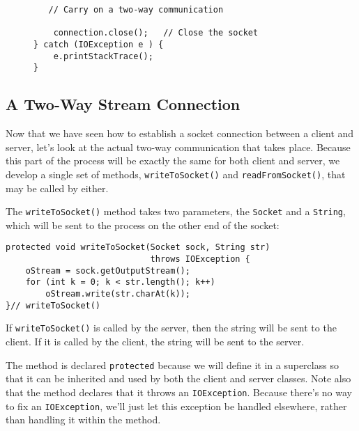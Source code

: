 {\begin{figure}[thb]
\begin{jjjlisting}
\begin{lstlisting}
   // Carry on a two-way communication

    connection.close();   // Close the socket
} catch (IOException e ) {
    e.printStackTrace();
}
\end{lstlisting}
\end{jjjlisting}
\end{figure}

\subsection{A Two-Way Stream Connection}
\noindent Now that we have seen how to establish a socket connection between a
client and server, let's look at the actual two-way communication that
takes place.  Because this part of the process will be exactly the same
for both client and server, we develop a single set of methods,
{\tt writeToSocket()} and {\tt readFromSocket()}, that may be called by
either.

The {\tt writeToSocket()} method takes two parameters, the
{\tt Socket} and a {\tt String}, which will be sent to the
process on the other end of the socket:

\begin{jjjlisting}
\begin{lstlisting}
protected void writeToSocket(Socket sock, String str) 
                             throws IOException {
    oStream = sock.getOutputStream();
    for (int k = 0; k < str.length(); k++)
        oStream.write(str.charAt(k));
}// writeToSocket()
\end{lstlisting}
\end{jjjlisting}


\noindent If {\tt writeToSocket()} is called by the server, then
the string will be sent to the client.  If it is called by the client,
the string will be sent to the server.

The method is declared {\tt protected} because we will define it in a
super\-class so that it can be inherited and used by both the client and
server classes.  Note also that the method declares that it throws an
{\tt IOException}. Because there's no way to fix an {\tt IOException},
we'll just let this exception be handled elsewhere, rather than
handling it within the method.

}

